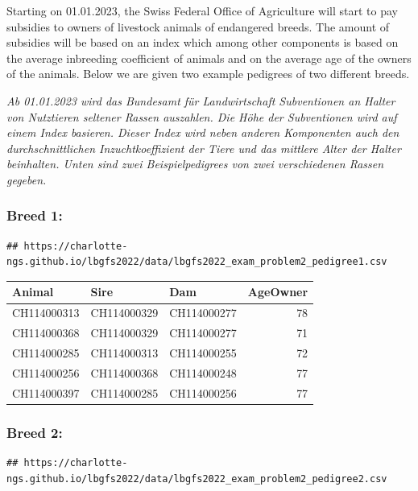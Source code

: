 \documentclass[
]{article}
\begin{document}
Starting on 01.01.2023, the Swiss Federal Office of Agriculture will
start to pay subsidies to owners of livestock animals of endangered
breeds. The amount of subsidies will be based on an index which among
other components is based on the average inbreeding coefficient of
animals and on the average age of the owners of the animals. Below we
are given two example pedigrees of two different breeds.

\textit{Ab 01.01.2023 wird das Bundesamt für Landwirtschaft Subventionen an Halter von Nutztieren seltener Rassen auszahlen. Die Höhe der Subventionen wird auf einem Index basieren. Dieser Index wird neben anderen Komponenten auch den durchschnittlichen Inzuchtkoeffizient der Tiere und das mittlere Alter der Halter beinhalten. Unten sind zwei Beispielpedigrees von zwei verschiedenen Rassen gegeben.}

\hypertarget{breed-1}{%
\subsubsection{Breed 1:}\label{breed-1}}

\begin{verbatim}
## https://charlotte-ngs.github.io/lbgfs2022/data/lbgfs2022_exam_problem2_pedigree1.csv
\end{verbatim}

\begin{longtable}[]{@{}lllr@{}}
\toprule()
Animal & Sire & Dam & AgeOwner \\
\midrule()
\endhead
CH114000313 & CH114000329 & CH114000277 & 78 \\
CH114000368 & CH114000329 & CH114000277 & 71 \\
CH114000285 & CH114000313 & CH114000255 & 72 \\
CH114000256 & CH114000368 & CH114000248 & 77 \\
CH114000397 & CH114000285 & CH114000256 & 77 \\
\bottomrule()
\end{longtable}

\hypertarget{breed-2}{%
\subsubsection{Breed 2:}\label{breed-2}}

\begin{verbatim}
## https://charlotte-ngs.github.io/lbgfs2022/data/lbgfs2022_exam_problem2_pedigree2.csv
\end{verbatim}
\end{document}
